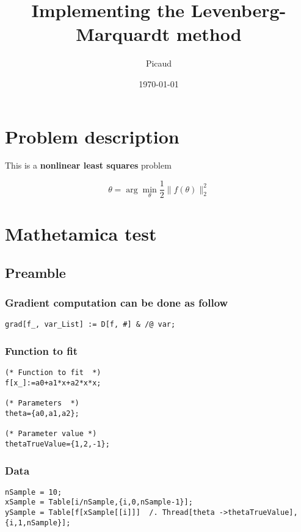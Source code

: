 \documentclass[11pt]{article}
\author{Picaud}
\date{\today}
\title{Implementing the Levenberg-Marquardt method}
\begin{document}
\maketitle

\section*{Problem description}
\label{sec:orgheadline1}

This is a \textbf{nonlinear least squares} problem

\[
\theta = \arg \min \limits_\theta \frac{1}{2}\|f(\theta)\|^2_2
\]

\section*{Mathetamica test}
\label{sec:orgheadline6}

\subsection*{Preamble}
\label{sec:orgheadline5}

\subsubsection*{Gradient computation can be done as follow}
\label{sec:orgheadline2}

\begin{verbatim}
grad[f_, var_List] := D[f, #] & /@ var;
\end{verbatim}

\subsubsection*{Function to fit}
\label{sec:orgheadline3}

\begin{verbatim}
(* Function to fit  *)
f[x_]:=a0+a1*x+a2*x*x;

(* Parameters  *)
theta={a0,a1,a2};

(* Parameter value *)
thetaTrueValue={1,2,-1};
\end{verbatim}

\subsubsection*{Data}
\label{sec:orgheadline4}
\begin{verbatim}
nSample = 10;
xSample = Table[i/nSample,{i,0,nSample-1}];
ySample = Table[f[xSample[[i]]]  /. Thread[theta ->thetaTrueValue],{i,1,nSample}];
\end{verbatim}
\end{document}
